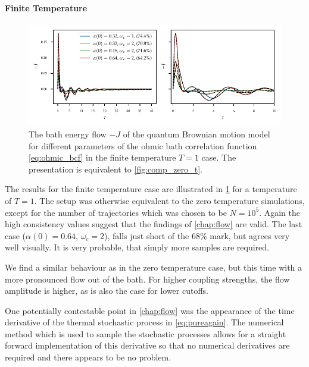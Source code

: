 
\paragraph{Finite Temperature}
\begin{figure}[t]
  \centering
  \includegraphics{figs/analytic_comp/flow_comp_nonzero.pdf}
  \caption{\label{fig:comp_finite_t} The bath energy flow \(-J\) of
    the quantum Brownian motion model for different parameters of the
    ohmic bath correlation function \cref{eq:ohmic_bcf} in the finite
    temperature \(T=1\) case. The presentation is equivalent to
    \cref{fig:comp_zero_t}.}
\end{figure}
The results for the finite temperature case are illustrated in
\cref{fig:comp_finite_t} for a temperature of \(T=1\). The setup was
otherwise equivalent to the zero temperature simulations, except for
the number of trajectories which was chosen to be \(N=10^5\).  Again
the high consistency values suggest that the findings of
\cref{chap:flow} are valid. The last case (\(α(0)=0.64,\, ω_c=2\)),
falls just short of the \(68\%\) mark, but agrees very well
visually. It is very probable, that simply more samples are required.

We find a similar behaviour as in the zero temperature case, but this
time with a more pronounced flow out of the bath. For higher coupling
strengths, the flow amplitude is higher, as is also the case for lower
cutoffs.

One potentially contestable point in \cref{chap:flow} was the
appearance of the time derivative of the thermal stochastic process in
\cref{eq:pureagain}. The numerical method which is used to sample the
stochastic processes allows for a straight forward implementation of
this derivative so that no numerical derivatives are required and
there appears to be no problem.

